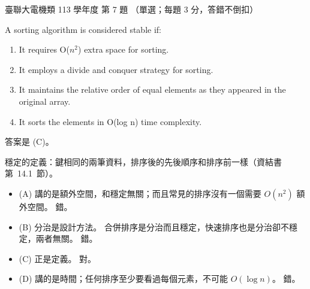 \begin{pastexam}[label={px:ust-113-ee-ds-07}]{臺聯大電機類 113 學年度 第 7 題}
（單選；每題 3 分，答錯不倒扣）

A sorting algorithm is considered stable if:
\begin{enumerate}[label=(\Alph*)]
\item It requires O($n^2$) extra space for sorting.
\item It employs a divide and conquer strategy for sorting.
\item It maintains the relative order of equal elements as they appeared in the original array.
\item It sorts the elements in O(log n) time complexity.
\end{enumerate}
\end{pastexam}

\begin{pastsoln}
答案是 (C)。

穩定的定義：鍵相同的兩筆資料，排序後的先後順序和排序前一樣（資結書第~14.1~節）。
\begin{itemize}
\item (A) 講的是額外空間，和穩定無關；而且常見的排序沒有一個需要 $O(n^2)$ 額外空間。 錯。
\item (B) 分治是設計方法。 合併排序是分治而且穩定，快速排序也是分治卻不穩定，兩者無關。 錯。
\item (C) 正是定義。 對。
\item (D) 講的是時間；任何排序至少要看過每個元素，不可能 $O(\log n)$。 錯。
\end{itemize}
\end{pastsoln}
